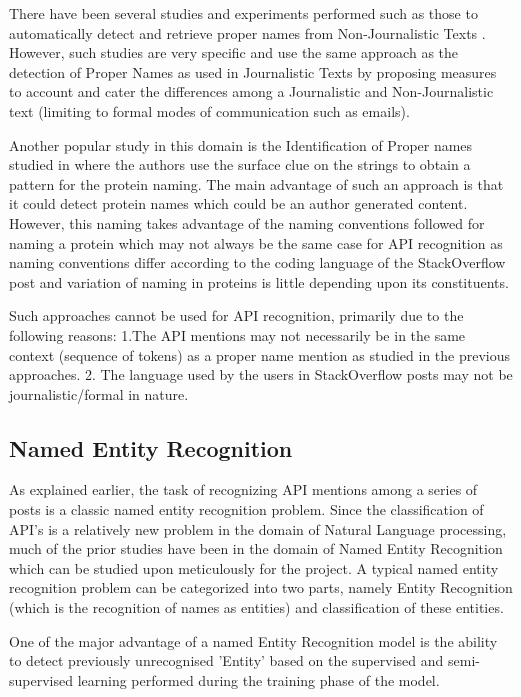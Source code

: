 \documentclass{sig-alternate-05-2015}
\begin{document}
There have been several studies and experiments performed such as those to automatically detect and retrieve proper names from Non-Journalistic Texts \cite{poibeau2001proper}. However, such studies are very specific and use the same approach as the detection of Proper Names as used in Journalistic Texts by proposing measures to account and cater the differences among a Journalistic and Non-Journalistic text (limiting to formal modes of communication such as emails).

Another popular study in this domain is the Identification of Proper names studied in \cite{fukuda1998toward} where the authors use the surface clue on the strings to obtain a pattern for the protein naming. The main advantage of such an approach is that it could detect protein names which could be an author generated content. However, this naming takes advantage of the naming conventions followed for naming a protein which may not always be the same case for API recognition as naming conventions differ according to the coding language of the StackOverflow post and variation of naming in proteins is little depending upon its constituents.

Such approaches cannot be used for API recognition, primarily due to the following reasons: 1.The API mentions may not necessarily be in the same context (sequence of tokens) as a proper name mention as studied in the previous approaches. 2. The language used by the users in StackOverflow posts may not be journalistic/formal in nature.

\subsection{Named Entity Recognition}
As explained earlier, the task of recognizing API mentions among a series of posts is a classic named entity recognition problem. Since the classification of API's is a relatively new problem in the domain of Natural Language processing, much of the prior studies have been in the domain of Named Entity Recognition which can be studied upon meticulously for the project. A typical named entity recognition problem can be categorized into two parts, namely Entity Recognition (which is the recognition of names as entities) and classification of these entities\cite{tjong2003introduction}.

One of the major advantage of a named Entity Recognition model is the ability to detect previously unrecognised 'Entity' based on the supervised and semi-supervised learning performed during the training phase of the model.
\end{document}
